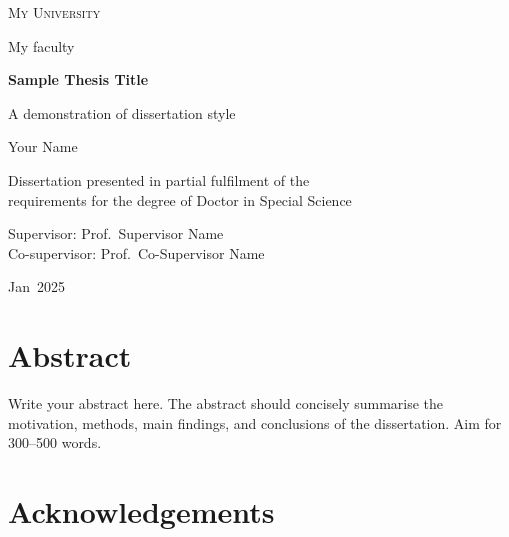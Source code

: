 \documentclass[10pt,b5paper,twoside,openright]{book}
\newcommand{\ThesisTitle}{Sample Thesis Title}
\newcommand{\ThesisSubtitle}{A demonstration of dissertation style}
\newcommand{\ThesisAuthor}{Your Name}
\newcommand{\ThesisDegree}{Doctor in Special Science}
\newcommand{\ThesisFaculty}{My faculty}
\newcommand{\ThesisInstitution}{My University}
\newcommand{\ThesisSupervisor}{Prof.\ Supervisor Name}
\newcommand{\ThesisCoSupervisor}{Prof.\ Co-Supervisor Name}
\newcommand{\ThesisMonth}{Jan}
\newcommand{\ThesisYear}{2025}
\begin{document}
\frontmatter
\pagestyle{plain}

\begin{titlepage}
  \centering
  \vspace*{1cm}
  {\large\scshape\ThesisInstitution\par}
  \vspace{0.25cm}
  {\normalsize\ThesisFaculty\par}
  \vspace{2.5cm}
  {\Huge\bfseries\ThesisTitle\par}
  \vspace{1cm}
  {\Large\ThesisSubtitle\par}
  \vfill
  {\large\ThesisAuthor\par}
  \vspace{1.2cm}
  {\normalsize
    Dissertation presented in partial fulfilment of the\\
    requirements for the degree of \ThesisDegree\par}
  \vspace{1cm}
  {\normalsize
    Supervisor: \ThesisSupervisor\\
    Co-supervisor: \ThesisCoSupervisor\par}
  \vspace{1cm}
  {\normalsize\ThesisMonth\ \ThesisYear\par}
  \vspace{1cm}
\end{titlepage}

\cleardoublepage

\chapter*{Abstract}

Write your abstract here. The abstract should concisely summarise the
motivation, methods, main findings, and conclusions of the dissertation.
Aim for 300--500 words.

\cleardoublepage

\chapter*{Acknowledgements}
\end{document}
